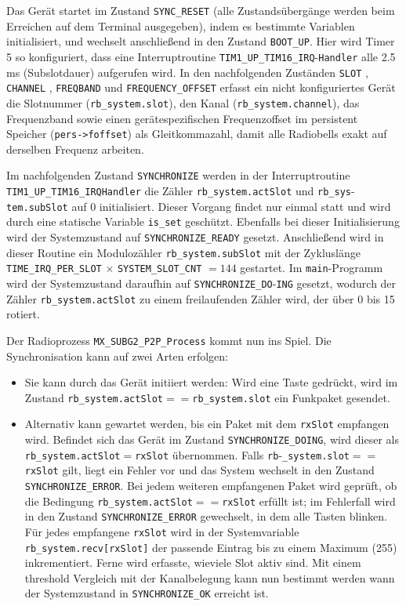 Das Gerät startet im Zustand \verb|SYNC_RESET| (alle Zustandsübergänge werden beim Erreichen auf dem Terminal ausgegeben), indem es bestimmte Variablen initialisiert, und wechselt anschließend in den Zustand \verb|BOOT_UP|. Hier wird Timer 5 so konfiguriert, dass eine Interruptroutine \verb|TIM1_UP_TIM16_IRQ|-\verb|Handler| alle 2.5\,ms (Subslotdauer) aufgerufen wird. In den nachfolgenden Zuständen \verb|SLOT| , \verb|CHANNEL| , \verb|FREQBAND| und \verb|FREQUENCY_OFFSET| erfasst ein nicht konfiguriertes Gerät die Slotnummer (\verb|rb_system.slot|), den Kanal (\verb|rb_system.channel|), das Frequenzband sowie einen gerätespezifischen Frequenzoffset im persistent Speicher (\verb|pers->foffset|) als Gleitkommazahl, damit alle Radiobells exakt auf derselben Frequenz arbeiten.

Im nachfolgenden Zustand \verb|SYNCHRONIZE| werden in der Interruptroutine \verb|TIM1_UP_TIM16_IRQHandler| die Zähler \verb|rb_system.actSlot| und \verb|rb_sys|-\verb|tem.subSlot| auf 0 initialisiert. Dieser Vorgang findet nur einmal statt und wird durch eine statische Variable \verb|is_set| geschützt. Ebenfalls bei dieser Initialisierung wird der Systemzustand auf \verb|SYNCHRONIZE_READY| gesetzt. Anschließend wird in dieser Routine ein Modulozähler \verb|rb_system.subSlot| mit der Zykluslänge \verb|TIME_IRQ_PER_SLOT| $\times$ \verb|SYSTEM_SLOT_CNT| $= 144$ gestartet. Im \verb|main|-Programm wird der Systemzustand daraufhin auf \verb|SYNCHRONIZE_DO|-\verb|ING| gesetzt, wodurch der Zähler \verb|rb_system.actSlot| zu einem freilaufenden Zähler wird, der über 0 bis 15 rotiert.

Der Radioprozess \verb|MX_SUBG2_P2P_Process| kommt nun ins Spiel. Die Synchronisation kann auf zwei Arten erfolgen:

\begin{itemize}
    \item Sie kann durch das Gerät initiiert werden: Wird eine Taste gedrückt, wird im Zustand \verb|rb_system.actSlot|$==$\verb|rb_system.slot| ein Funkpaket gesendet.

    \item Alternativ kann gewartet werden, bis ein Paket mit dem \verb|rxSlot| empfangen wird. Befindet sich das Gerät im Zustand \verb|SYNCHRONIZE_DOING|, wird dieser als \verb|rb_system.actSlot|$=$\verb|rxSlot| übernommen. Falls \verb|rb|-\verb|_system.slot|$==$\verb|rxSlot| gilt, liegt ein Fehler vor und das System wechselt in den Zustand \verb|SYNCHRONIZE_ERROR|. Bei jedem weiteren empfangenen Paket wird geprüft, ob die Bedingung \verb|rb_system.actSlot|$==$\verb|rxSlot| erfüllt ist; im Fehlerfall wird in den Zustand \verb|SYNCHRONIZE_ERROR| gewechselt, in dem alle Tasten blinken. Für jedes empfangene \verb|rxSlot| wird in der Systemvariable \verb|rb_system.recv[rxSlot]| der passende Eintrag bis zu einem Maximum (255) inkrementiert. Ferne wird erfasste, wieviele Slot aktiv sind. Mit einem threshold Vergleich mit der Kanalbelegung kann nun bestimmt werden wann der Systemzustand in \verb|SYNCHRONIZE_OK| erreicht ist.
\end{itemize}

